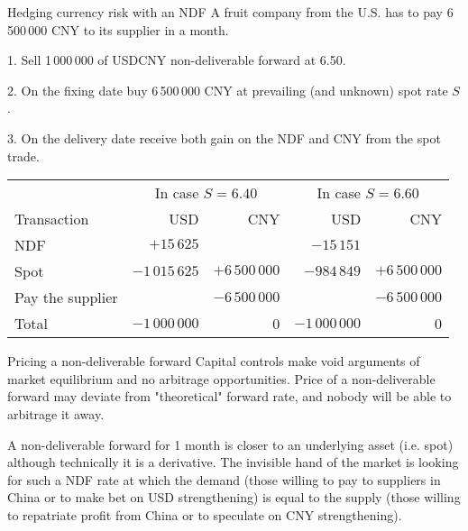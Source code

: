 \documentclass{beamer}
\begin{document}
\begin{frame}{Hedging currency risk with an NDF}
\justify
A fruit company from the U.S. has to pay 6\,500\,000 CNY to its supplier in a month.

1. Sell 1\,000\,000 of USDCNY non-deliverable forward at 6.50.

2. On the fixing date buy 6\,500\,000 CNY at prevailing (and unknown) spot rate  $S$.

3. On the delivery date receive both gain on the NDF and CNY from the spot trade.

\justify
\centering
\small
\begin{tabular}{l|r|r|r|r}
& \multicolumn{2}{c|}{In case $S=6.40$} & \multicolumn{2}{c}{In case $S=6.60$} \\ \cline{2-5}
Transaction & USD & CNY & USD & CNY \\ \hline
NDF & $+15\,625$ & & $-15\,151$ & \\
Spot & $-1\,015\,625$ & $+6\,500\,000$ & $-984\,849$ & $+6\,500\,000$ \\
Pay the supplier & & $-6\,500\,000$ & & $-6\,500\,000$ \\ \hline
Total & $-1\,000\,000$ & 0 & $-1\,000\,000$ & 0
\end{tabular}
\end{frame}



\begin{frame}{Pricing a non-deliverable forward}
\justify
Capital controls make void arguments of market equilibrium and no arbitrage opportunities. Price of a non-deliverable forward may deviate from "theoretical" forward rate, and nobody will be able to arbitrage it away.

\justify
A non-deliverable forward for 1 month is closer to an underlying asset (i.e. spot) although technically it is a derivative. The invisible hand of the market is looking for such a NDF rate at which the demand (those willing to pay to suppliers in China or to make bet on USD strengthening) is equal to the supply (those willing to repatriate profit from China or to speculate on CNY strengthening).
\end{frame}
\end{document}
